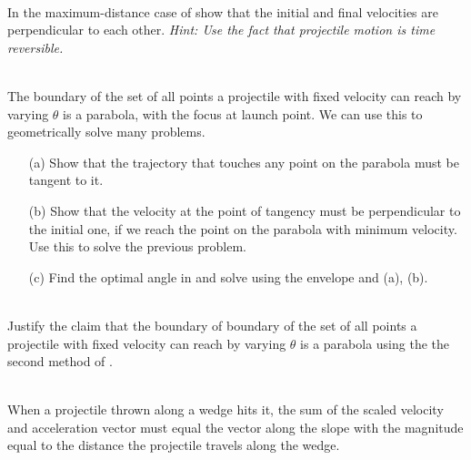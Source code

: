 \begin{exc}
        \begin{exercise}[subtitle={Perpendicular Velocities, Morin}, points = 3]
            \smallskip
            ~\\
            In the maximum-distance case of 
            show that the initial and final velocities are perpendicular to each other. \emph{Hint: Use the fact 
            that projectile motion is time reversible.}
        \end{exercise}

        \begin{exercise}[subtitle={Parabolic Envelope, Knzhou}, points = 4]
            \smallskip
            ~\\
            The boundary of the set of all points a projectile with fixed velocity can reach by varying $\theta$ is 
            a parabola, with the focus at launch point. We can use this to geometrically solve many problems.
            \begin{enumerate}
                \item[(a)] Show that the trajectory that touches any point on the parabola must be tangent to it.
                \item[(b)] Show that the velocity at the point of tangency must be perpendicular to the initial one, if 
                we reach the point on the parabola with minimum velocity. Use this to solve the previous problem.
                \item[(c)]  Find the optimal angle in  and solve 
                using the envelope and (a), (b). 
            \end{enumerate}
        \end{exercise}

        \begin{exercise}[subtitle={Parabolic Envelope}, points = 3]
        \smallskip
        ~\\
        Justify the claim that the boundary of boundary of the set of all points a projectile with fixed velocity can reach by varying $\theta$ is 
        a parabola using the the second method of .
        \end{exercise}

        \begin{exercise}[subtitle={Projectiles with Vector, V2.}, points = 3]
            \smallskip
            ~\\
            When a projectile thrown along a wedge hits it, the sum of the scaled velocity and acceleration vector 
            must equal the vector along the slope with the magnitude equal to the distance the projectile travels 
            along the wedge. 
            

\end{exercise}
\end{exc}
